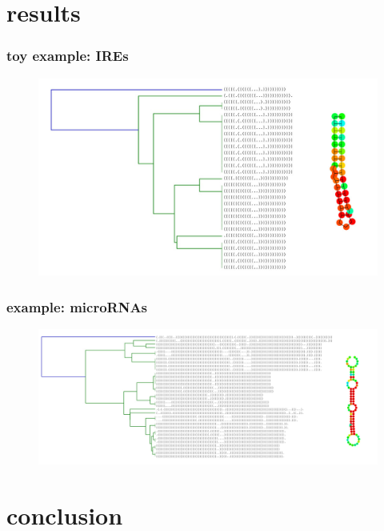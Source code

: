 \documentclass{beamer}
\begin{document}
\section{results}

\begin{frame}
	\frametitle{toy example: IREs}
	\begin{figure}
	\centering
	\includegraphics[scale=0.23]{figs/iresCons}
	\end{figure}
	
\end{frame}



\begin{frame}
	\frametitle{example: microRNAs}
	\begin{figure}
	\centering
	\includegraphics[scale=0.145]{figs/miRNACons}
	\end{figure}
	
\end{frame}


\section{conclusion}
\end{document}
